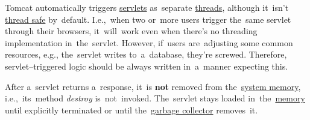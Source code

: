Tomcat automatically triggers \hyperref[servlet]{servlets} as~separate \hyperref[javathread]{threads}, although it~isn't \hyperref[javathreadsafety]{thread safe} by~default.
I.e.,~when two or~more users trigger the~same servlet through their browsers, it~will~work even when there's no threading implementation in~the~servlet.
However, if~users are~adjusting some common resources, e.g., the~servlet writes to~a~database, they're screwed.
Therefore, servlet--triggered logic should be always written in~a~manner expecting this.

\warning After a~servlet returns a~response, it~is \textbf{not} removed from the~\hyperref[systemmemory]{system memory}, i.e.,~its~method \textit{destroy} is~not~invoked.
The~servlet stays loaded in~the~\hyperref[systemmemory]{memory} until explicitly terminated or until the~\hyperref[garbagecollector]{garbage collector} removes~it.
